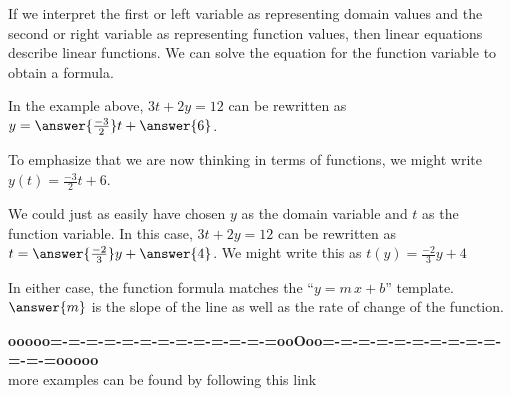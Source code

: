 \documentclass{ximera}
\begin{document}
\begin{explanation}
If we interpret the first or left variable as representing domain values and the second or right variable as representing function values, then linear equations describe linear functions.  We can solve the equation for the function variable to obtain a formula.



In the example above, $3 t + 2 y = 12$ can be rewritten as $y = \answer{\frac{-3}{2}} t + \answer{6}$.

To emphasize that we are now thinking in terms of functions, we might write $y(t) = \tfrac{-3}{2} t + 6$.




We could just as easily have chosen $y$ as the domain variable and $t$ as the function variable.  In this case, $3 t + 2 y = 12$ can be rewritten as $t = \answer{\frac{-2}{3}} y + \answer{4}$.  We might write this as $t(y) = \tfrac{-2}{3} y + 4$




In either case, the function formula matches the ``$y = m \, x + b$'' template.  $\answer{m}$ is the slope of the line as well as the rate of change of the function.


\end{explanation}










\begin{center}
\textbf{\textcolor{green!50!black}{ooooo=-=-=-=-=-=-=-=-=-=-=-=-=ooOoo=-=-=-=-=-=-=-=-=-=-=-=-=ooooo}} \\

more examples can be found by following this link\\ 

\end{center}
\end{document}
